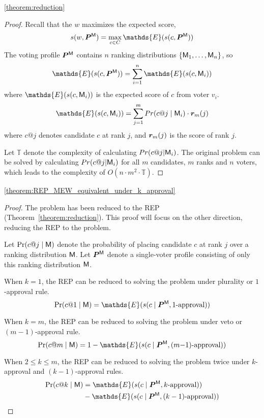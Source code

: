 \begin{reptheorem}{\ref{theorem:reduction}}
    \theoremReductionEscToRep
\end{reptheorem}

\begin{proof}
    Recall that the \mew $w$ maximizes the expected score, \ie
    \[
    \score(w, \probaVP) = \max_{c \in C}\mathds{E}(\score(c, \probaVP))
    \]
    The voting profile $\probaVP$ contains $n$ ranking distributions $\set{\enum[n]{\model}}$, so
    \[
    \mathds{E}(\score(c, \probaVP)) = \sum_{i=1}^{n} {\mathds{E}(\score(c, \model_i))}
    \]
    where $\mathds{E}(\score(c, \model_i))$ is the expected score of $c$ from voter $v_i$.
    \[
    \mathds{E}(\score(c, \model_i)) = \sum_{j=1}^{m} Pr(c@j \mid \model_i) \cdot \vr_m(j)
    \]
    where $c@j$ denotes candidate $c$ at rank $j$, and $\vr_m(j)$ is the score of rank $j$.
    
    Let $\mathds{T}$ denote the complexity of calculating $Pr(c@j {\mid} \model_i)$.
    The original \mew problem can be solved by calculating $Pr(c@j {\mid} \model_i)$ for all $m$ candidates, $m$ ranks and $n$ voters, which leads to the complexity of $O(n\cdot m^2 \cdot \mathds{T})$.
\end{proof}

\begin{reptheorem}{\ref{theorem:REP_MEW_equivalent_under_k_approval}}
    \theoremRepMewEquivalentUnderKapproval
\end{reptheorem}

\begin{proof}
    The \esc problem has been reduced to the REP (Theorem~\ref{theorem:reduction}).
    This proof will focus on the other direction, \ie reducing the REP to the \esc problem.
    
    Let $\Pr(c@j \mid \model)$ denote the probability of placing candidate $c$ at rank $j$ over a ranking distribution $\model$.
    Let $\VP^{\model}$ denote a single-voter profile consisting of only this ranking distribution $\model$.
    
    When $k=1$, the REP can be reduced to solving the \esc problem under plurality or $1$-approval rule.
    \[
    \Pr(c@1 \mid \model) = \mathds{E}(\score(c \mid \VP^{\model}, 1\text{-approval}))
    \]
    
    When $k=m$, the REP can be reduced to solving the \esc problem under veto or $(m {-} 1)$-approval rule.
    \[
    \Pr(c@m \mid \model) = 1 - \mathds{E}(\score(c \mid \VP^{\model}, (m {-} 1)\text{-approval}))
    \]
    
    When $2 \leq k \leq m$, the REP can be reduced to solving the \esc problem twice under $k$-approval and $(k-1)$-approval rules.
    \begin{align*}
        \Pr(c@k \mid \model) 
        &= \mathds{E}(\score(c \mid \VP^{\model}, k\text{-approval})) \\
        &- \mathds{E}(\score(c \mid \VP^{\model}, (k-1)\text{-approval}))
    \end{align*}
\end{proof}

